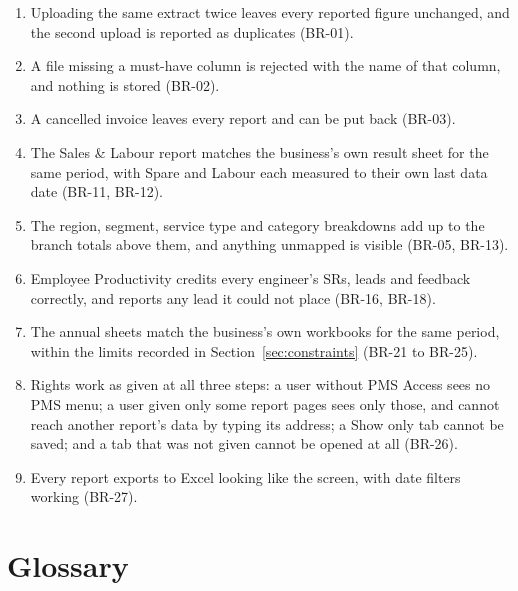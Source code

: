 \documentclass[11pt,a4paper]{article}
\begin{document}
\begin{enumerate}[leftmargin=2.2em,itemsep=4pt]
  \item Uploading the same extract twice leaves every reported figure unchanged, and the
  second upload is reported as duplicates (BR-01).
  \item A file missing a must-have column is rejected with the name of that column, and
  nothing is stored (BR-02).
  \item A cancelled invoice leaves every report and can be put back (BR-03).
  \item The Sales \& Labour report matches the business's own result sheet for the same
  period, with Spare and Labour each measured to their own last data date (BR-11, BR-12).
  \item The region, segment, service type and category breakdowns add up to the branch
  totals above them, and anything unmapped is visible (BR-05, BR-13).
  \item Employee Productivity credits every engineer's SRs, leads and feedback correctly,
  and reports any lead it could not place (BR-16, BR-18).
  \item The annual sheets match the business's own workbooks for the same period, within
  the limits recorded in Section~\ref{sec:constraints} (BR-21 to BR-25).
  \item Rights work as given at all three steps: a user without PMS Access sees no PMS
  menu; a user given only some report pages sees only those, and cannot reach another
  report's data by typing its address; a Show only tab cannot be saved; and a tab that was
  not given cannot be opened at all (BR-26).
  \item Every report exports to Excel looking like the screen, with date filters working
  (BR-27).
\end{enumerate}

\appendix
\section{Glossary}
\end{document}
